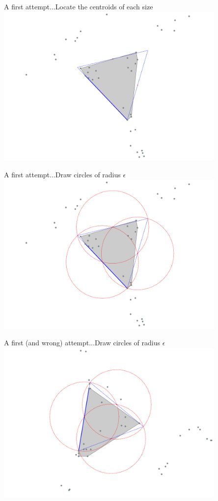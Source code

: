\documentclass{beamer}
\begin{document}
\begin{frame}{A first attempt...}{Locate the centroids of each size}
    \centering
    \includegraphics[width=0.85\textwidth]{figures/centroids_69}
\end{frame}
\begin{frame}{A first attempt...}{Draw circles of radius $\epsilon$}
    \centering
    \includegraphics[width=0.85\textwidth]{figures/circles_69}
\end{frame}

\begin{frame}{A first (and wrong) attempt...}{Draw circles of radius $\epsilon$}
    \centering
    \includegraphics[width=0.85\textwidth]{figures/output_90}
\end{frame}
\end{document}
